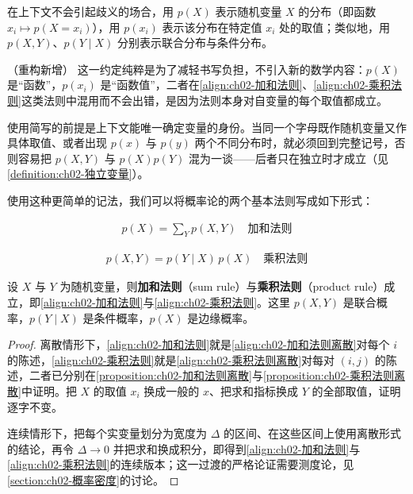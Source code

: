 \documentclass[../../main.tex]{subfiles}
\begin{document}
\begin{definition}[概率的简写记号]\label{definition:ch02-简写记号}
在上下文不会引起歧义的场合，用 $p(X)$ 表示随机变量 $X$ 的分布（即函数 $x_i\mapsto p(X=x_i)$），用 $p(x_i)$ 表示该分布在特定值 $x_i$ 处的取值；类似地，用 $p(X,Y)$、$p(Y\mid X)$ 分别表示联合分布与条件分布。
\end{definition}

\begin{remark}（重构新增）
这一约定纯粹是为了减轻书写负担，不引入新的数学内容：$p(X)$ 是“函数”，$p(x_i)$ 是“函数值”，二者在\eqref{align:ch02-加和法则}、\eqref{align:ch02-乘积法则}这类法则中混用而不会出错，是因为法则本身对自变量的每个取值都成立。

使用简写的前提是上下文能唯一确定变量的身份。当同一个字母既作随机变量又作具体取值、或者出现 $p(x)$ 与 $p(y)$ 两个不同分布时，就必须回到完整记号，否则容易把 $p(X,Y)$ 与 $p(X)p(Y)$ 混为一谈——后者只在独立时才成立（见\cref{definition:ch02-独立变量}）。
\end{remark}

使用这种更简单的记法，我们可以将概率论的两个基本法则写成如下形式：

\begin{align}
  p(X) = \sum_{Y} p(X,Y) \quad \text{加和法则}
  \label{align:ch02-加和法则}
\end{align}

\begin{align}
  p(X,Y) = p(Y\mid X)\,p(X) \quad \text{乘积法则}
  \label{align:ch02-乘积法则}
\end{align}

\begin{theorem}[概率论的两个基本法则]\label{theorem:ch02-两个基本法则}
设 $X$ 与 $Y$ 为随机变量，则\textbf{加和法则}（sum rule）与\textbf{乘积法则}（product rule）成立，即\eqref{align:ch02-加和法则}与\eqref{align:ch02-乘积法则}。这里 $p(X,Y)$ 是联合概率，$p(Y\mid X)$ 是条件概率，$p(X)$ 是边缘概率。
\end{theorem}

\begin{proof}
离散情形下，\eqref{align:ch02-加和法则}就是\eqref{align:ch02-加和法则离散}对每个 $i$ 的陈述，\eqref{align:ch02-乘积法则}就是\eqref{align:ch02-乘积法则离散}对每对 $(i,j)$ 的陈述，二者已分别在\cref{proposition:ch02-加和法则离散}与\cref{proposition:ch02-乘积法则离散}中证明。把 $X$ 的取值 $x_i$ 换成一般的 $x$、把求和指标换成 $Y$ 的全部取值，证明逐字不变。

连续情形下，把每个实变量划分为宽度为 $\Delta$ 的区间、在这些区间上使用离散形式的结论，再令 $\Delta\to0$ 并把求和换成积分，即得到\eqref{align:ch02-加和法则}与\eqref{align:ch02-乘积法则}的连续版本；这一过渡的严格论证需要测度论，见\cref{section:ch02-概率密度}的讨论。
\end{proof}
\end{document}
